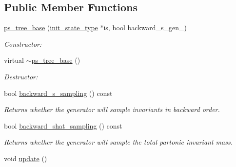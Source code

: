 \subsection*{Public Member Functions}
\begin{DoxyCompactItemize}
\item 
\hypertarget{a00458_a10fd52abdaa96cbccbc59a79e3d74b2a}{}\hyperlink{a00458_a10fd52abdaa96cbccbc59a79e3d74b2a}{ps\+\_\+tree\+\_\+base} (\hyperlink{a00308}{init\+\_\+state\+\_\+type} $\ast$is, bool backward\+\_\+s\+\_\+gen\+\_\+)\label{a00458_a10fd52abdaa96cbccbc59a79e3d74b2a}

\begin{DoxyCompactList}\small\item\em Constructor\+: \end{DoxyCompactList}\item 
\hypertarget{a00458_aeadb017f285ea234712594fd9b48de43}{}virtual \hyperlink{a00458_aeadb017f285ea234712594fd9b48de43}{$\sim$ps\+\_\+tree\+\_\+base} ()\label{a00458_aeadb017f285ea234712594fd9b48de43}

\begin{DoxyCompactList}\small\item\em Destructor\+: \end{DoxyCompactList}\item 
\hypertarget{a00458_aeac7255f0abbe5f05ca1229e3d9f703c}{}bool \hyperlink{a00458_aeac7255f0abbe5f05ca1229e3d9f703c}{backward\+\_\+s\+\_\+sampling} () const \label{a00458_aeac7255f0abbe5f05ca1229e3d9f703c}

\begin{DoxyCompactList}\small\item\em Returns whether the generator will sample invariants in backward order. \end{DoxyCompactList}\item 
\hypertarget{a00458_aed1aabaa6da8c2739dc0ff4ba3b30192}{}bool \hyperlink{a00458_aed1aabaa6da8c2739dc0ff4ba3b30192}{backward\+\_\+shat\+\_\+sampling} () const \label{a00458_aed1aabaa6da8c2739dc0ff4ba3b30192}

\begin{DoxyCompactList}\small\item\em Returns whether the generator will sample the total partonic invariant mass. \end{DoxyCompactList}\item 
\hypertarget{a00458_ab777849e02b44c0ff14797c96d8c5c0e}{}void \hyperlink{a00458_ab777849e02b44c0ff14797c96d8c5c0e}{update} ()\label{a00458_ab777849e02b44c0ff14797c96d8c5c0e}


\end{DoxyCompactItemize}

